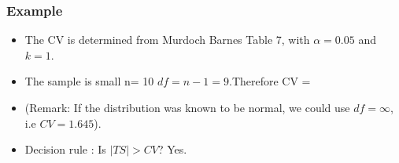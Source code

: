 \begin{frame}
\frametitle{Example}
\large
\begin{itemize}
\item The CV is determined from Murdoch Barnes Table 7, with $\alpha = 0.05$ and $k = 1$.
\item The sample is small n= 10  $df = n-1 = 9$.Therefore CV = 
\item (Remark: If the distribution was known to be normal, we could use $df = \infty$, i.e $CV = 1.645$).
\item Decision rule : Is $|TS| >CV$? Yes. 
\end{itemize}
\end{frame}


